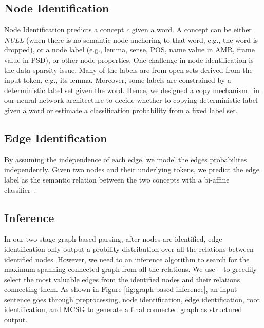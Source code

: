 \subsection{Node Identification}
\label{ssec:node_ident}
Node Identification predicts a concept $c$ given a word. A
concept can be either {\it NULL} (when there is no semantic node
anchoring to that word, e.g., the word is dropped), or a node label
(e.g., lemma, sense, POS, name value in AMR, frame value in PSD), or
other node properties. One challenge in node identification is the
data sparsity issue. Many of the labels are from open sets derived
from the input token, e.g., its lemma.  Moreover, some labels are
constrained by a deterministic label set given the word. Hence, we
designed a copy mechanism~\cite{luong2014addressing} in our neural
network architecture to decide whether to copying deterministic label
given a word or estimate a classification probability from a fixed
label set.


\subsection{Edge Identification}
\label{ssec:edge_ident}

By assuming the independence of each edge, we model the edges
probabilites independently.  Given two nodes and their underlying
tokens, we predict the edge label as the semantic relation between the
two concepts with a bi-affine classifier~\cite{dozat2016deep}.

\subsection{Inference}
\label{ssec:lex:inference}
In our two-stage graph-based parsing, after nodes are identified, edge
identification only output a probility distribution over all the
relations between identified nodes. However, we need to an inference
algorithm to search for the maximum spanning connected graph from all
the relations. We use ~\citet[MSCG,][]{Flanigan:2014vc} to greedily
select the most valuable edges from the identified nodes and their
relations connecting them. As shown in Figure
\ref{fig:graph-based-inference}, an input sentence goes through
preprocessing, node identification, edge identification, root
identification, and MCSG to generate a final connected graph as
structured output.
